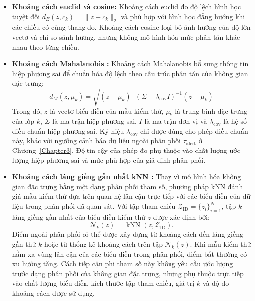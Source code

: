 \begin{itemize}
    \item \textbf{Khoảng cách euclid và cosine:}
    Khoảng cách euclid đo độ lệch hình học tuyệt đối $d_E(z,c_k)=\|z-c_k\|_2$ \label{eq:euclid} và phù hợp với hình học đẳng hướng khi các chiều có cùng thang đo. Khoảng cách cosine loại bỏ ảnh hưởng của độ lớn vectơ và chỉ so sánh hướng, nhưng không mô hình hóa mức phân tán khác nhau theo từng chiều.
    \item \textbf{Khoảng cách Mahalanobis \cite{Lee2018MahalanobisOOD}:} Khoảng cách Mahalanobis bổ sung thông tin hiệp phương sai để chuẩn hóa độ lệch theo cấu trúc phân tán của không gian đặc trưng:
    \begin{equation}
    d_M(z,\mu_k)=\sqrt{(z-\mu_k)^\top(\Sigma+\lambda_{\mathrm{cov}} I)^{-1}(z-\mu_k)}
    \label{eq:mahalanobis}
    \end{equation}
    Trong đó, $z$ là vectơ biểu diễn của mẫu kiểm thử, $\mu_k$ là trung bình đặc trưng của lớp $k$, $\Sigma$ là ma trận hiệp phương sai, $I$ là ma trận đơn vị và $\lambda_{\mathrm{cov}}$ là hệ số điều chuẩn hiệp phương sai. Ký hiệu $\lambda_{\mathrm{cov}}$ chỉ được dùng cho phép điều chuẩn này, khác với ngưỡng cảnh báo dữ liệu ngoài phân phối $\tau_{\mathrm{alert}}$ ở Chương~\ref{Chapter3}. Độ tin cậy của phép đo phụ thuộc vào chất lượng ước lượng hiệp phương sai và mức phù hợp của giả định phân phối.
    \item \textbf{Khoảng cách láng giềng gần nhất kNN \cite{Sun2022KNN}:}
    Thay vì mô hình hóa không gian đặc trưng bằng một dạng phân phối tham số, phương pháp kNN đánh giá mẫu kiểm thử dựa trên quan hệ lân cận trực tiếp với các biểu diễn của dữ liệu trong phân phối đã quan sát. Với tập tham chiếu $\mathcal{Z}_{\mathrm{ID}}=\{z_i\}_{i=1}^{N}$, tập $k$ láng giềng gần nhất của biểu diễn kiểm thử $z$ được xác định bởi:
    \begin{equation}
    \mathcal{N}_k(z)=\operatorname{kNN}(z,\mathcal{Z}_{\mathrm{ID}}).
    \label{eq:knn_neighbors}
    \end{equation}
    Điểm ngoài phân phối có thể được xây dựng từ khoảng cách đến láng giềng gần thứ $k$ hoặc từ thống kê khoảng cách trên tập $\mathcal{N}_k(z)$. Khi mẫu kiểm thử nằm xa vùng lân cận của các biểu diễn trong phân phối, điểm bất thường có xu hướng tăng. Cách tiếp cận phi tham số này không yêu cầu ước lượng trước dạng phân phối của không gian đặc trưng, nhưng phụ thuộc trực tiếp vào chất lượng biểu diễn, kích thước tập tham chiếu, giá trị $k$ và độ đo khoảng cách được sử dụng.
\end{itemize}

